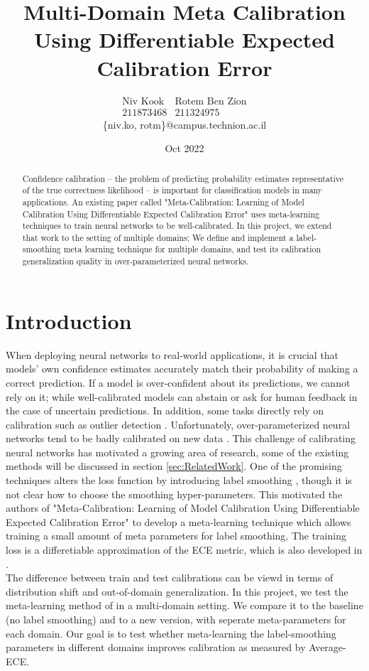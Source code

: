 \documentclass[12pt,a4paper]{article}
\title{Multi-Domain Meta Calibration Using Differentiable Expected Calibration Error}
\author{$ \begin{matrix} \text{Niv Kook} \\ 211873468 \end{matrix} $\qquad\qquad\qquad $ \begin{matrix} \text{Rotem Ben Zion} \\ 211324975 \end{matrix} $\\[\bigskipamount]
	\{niv.ko, rotm\}@campus.technion.ac.il}
\date{Oct 2022}
\begin{document}
	
\maketitle
\begin{abstract}
Confidence calibration – the problem of predicting probability estimates representative of the true correctness likelihood – is important for classification models in many applications. An existing paper called "Meta-Calibration: Learning of Model Calibration Using
Differentiable Expected Calibration Error" uses meta-learning techniques to train neural networks to be well-calibrated.
In this project, we extend that work to the setting of multiple domains; We define and implement a label-smoothing meta learning technique for multiple domains, and test its calibration generalization quality in over-parameterized neural networks.
\end{abstract}

\section{Introduction}
\label{sec:Introduction}
	When deploying neural networks to real-world applications, it is crucial that models’ own confidence estimates accurately match their
	probability of making a correct prediction. If a model is over-confident about its predictions, we cannot rely on it; while well-calibrated
	models can abstain or ask for human feedback in the case of uncertain predictions. In addition, some tasks directly rely on calibration such as outlier detection \citep{hendrycks2016baseline}. Unfortunately, over-parameterized neural networks tend to be badly calibrated on new data \citep{guo2017calibration}.
	This challenge of calibrating neural networks has motivated a growing area of research, some of the existing methods will be discussed in section \ref{sec:RelatedWork}. One of the promising techniques alters the loss function by introducing label smoothing \citep{muller2019does}, though it is not clear how to choose the smoothing hyper-parameters.
	This motivated the authors of "Meta-Calibration: Learning of Model Calibration Using Differentiable Expected Calibration Error" \citep{bohdal2021meta} to develop a meta-learning technique which allows training a small amount of meta parameters for label smoothing. The training loss is a differetiable approximation of the ECE metric, which is also developed in \cite{bohdal2021meta}. \\
	The difference between train and test calibrations can be viewd in terms of distribution shift and out-of-domain generalization.
	In this project, we test the meta-learning method of \cite{bohdal2021meta} in a multi-domain setting. We compare it to the baseline (no label smoothing) and to a new version, with seperate meta-parameters for each domain. Our goal is to test whether meta-learning the label-smoothing parameters in different domains improves calibration as measured by Average-ECE.
\end{document}
